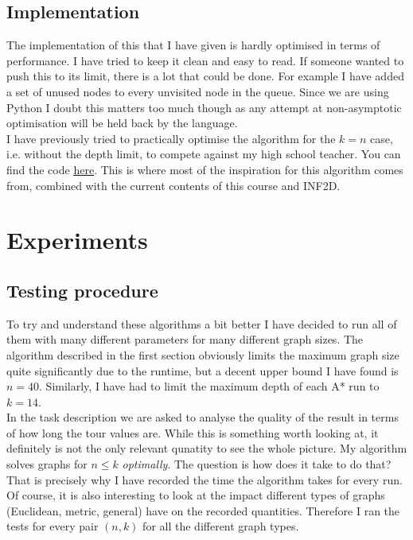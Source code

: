 \documentclass{article}
\begin{document}
\subsection{Implementation}

The implementation of this that I have given is hardly optimised in terms
of performance. I have tried to keep it clean and easy to read. If
someone wanted to push this to its limit, there is a lot that could be done.
For example I have added a set of unused nodes to every unvisited node in the
queue. Since we are using Python I doubt this matters too much though as any 
attempt at non-asymptotic optimisation will be held back by the language.\\
I have previously tried to practically optimise the algorithm for the $k=n$ 
case, i.e. without the depth limit, to compete against my high school teacher.
You can find the code \underline{\href{https://github.com/miltfra/tsp}{here}}.
This is where most of the inspiration for this algorithm comes from, combined
with the current contents of this course and INF2D.

\section{Experiments}

\subsection{Testing procedure}

To try and understand these algorithms a bit better I have decided to run all of
them with many different parameters for many different graph sizes. The algorithm
described in the first section obviously limits the maximum graph size quite
significantly due to the runtime, but a decent upper bound I have found is $n=40$.
Similarly, I have had to limit the maximum depth of each A* run to $k=14$.\\
In the task description we are asked to analyse the quality of the result
in terms of how long the tour values are.
While this is something worth looking at, it definitely is not the only
relevant qunatity to see the whole picture. My algorithm solves graphs
for $n\leq k$ \emph{optimally}. The question is how does it take to do that?
That is precisely why I have recorded the time the algorithm takes for every run.
Of course, it is also interesting to look at the impact different types of graphs
(Euclidean, metric, general) have on the recorded quantities. Therefore I ran the
tests for every pair $(n,k)$ for all the different graph types.
\end{document}

